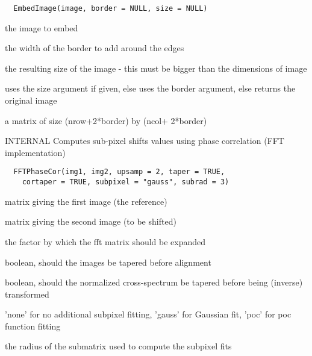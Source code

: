 \documentclass[a4paper]{book}
\begin{document}
%
\begin{Usage}
\begin{verbatim}
  EmbedImage(image, border = NULL, size = NULL)
\end{verbatim}
\end{Usage}
%
\begin{Arguments}
\begin{ldescription}
\item[\code{image}] the image to embed

\item[\code{border}] the width of the border to add around the
edges

\item[\code{size}] the resulting size of the image - this must
be bigger than the dimensions of image
\end{ldescription}
\end{Arguments}
%
\begin{Details}\relax
uses the size argument if given, else uses the border
argument, else returns the original image
\end{Details}
%
\begin{Value}
a matrix of size (nrow+2*border) by (ncol+ 2*border)
\end{Value}
%
\begin{Description}\relax
INTERNAL Computes sub-pixel shifts values using phase
correlation (FFT implementation)
\end{Description}
%
\begin{Usage}
\begin{verbatim}
  FFTPhaseCor(img1, img2, upsamp = 2, taper = TRUE,
    cortaper = TRUE, subpixel = "gauss", subrad = 3)
\end{verbatim}
\end{Usage}
%
\begin{Arguments}
\begin{ldescription}
\item[\code{img1}] matrix giving the first image (the
reference)

\item[\code{img2}] matrix giving the second image (to be
shifted)

\item[\code{upsamp}] the factor by which the fft matrix should
be expanded

\item[\code{taper}] boolean, should the images be tapered before
alignment

\item[\code{cortaper}] boolean, should the normalized
cross-spectrum be tapered before being (inverse)
transformed

\item[\code{subpixel}] 'none' for no additional subpixel
fitting, 'gauss' for Gaussian fit, 'poc' for poc function
fitting

\item[\code{subrad}] the radius of the submatrix used to compute
the subpixel fits
\end{ldescription}
\end{Arguments}
\end{document}

